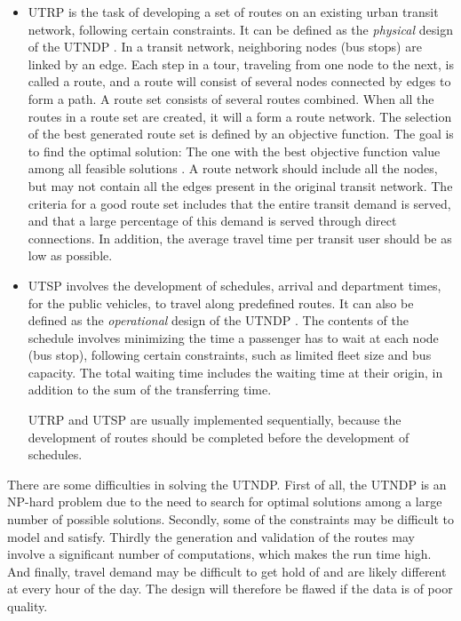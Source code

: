 \begin{itemize}
\item UTRP is the task of developing a set of routes on an existing urban transit network, following certain constraints. It can be defined as the \textit{physical} design of the UTNDP \citep{fan09}. In a transit network, neighboring nodes (bus stops) are linked by an edge. Each step in a tour, traveling from one node to the next, is called a route, and a route will consist of several nodes connected by edges to form a path. A route set consists of several routes combined. When all the routes in a route set are created, it will a form a route network. The selection of the best generated route set is defined by an objective function. The goal is to find the optimal solution: The one with the best objective function value among all feasible solutions \citep{vehiclerouting}. A route network should include all the nodes, but may not contain all the edges present in the original transit network. The criteria for a good route set includes that the entire transit demand is served, and that a large percentage of this demand is served through direct connections. In addition, the average travel time per transit user should be as low as possible. 

\item UTSP involves the development of schedules, arrival and department times, for the public vehicles, to travel along predefined routes. It can also be defined as the \textit{operational} design of the UTNDP \citep{fan09}. 
The contents of the schedule involves minimizing the time a passenger has to wait at each node (bus stop), following certain constraints, such as limited fleet size and bus capacity.  The total waiting time includes the waiting time at their origin, in addition to the sum of the transferring time.

UTRP and UTSP are usually implemented sequentially, because the development of routes should be completed before the development of schedules. 
\end{itemize}

There are some difficulties in solving the UTNDP. First of all, the UTNDP is an NP-hard problem due to the need to search for optimal solutions among a large number of possible solutions. Secondly, some of the constraints may be difficult to model and satisfy. Thirdly the generation and validation of the routes may involve a significant number of computations, which makes the run time high. And finally, travel demand may be difficult to get hold of and are likely different at every hour of the day. The design will therefore be flawed if the data is of poor quality.  

